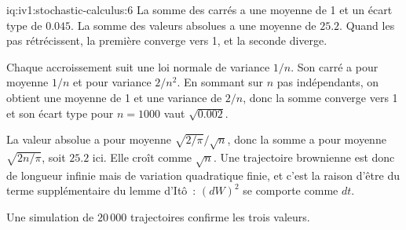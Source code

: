 \begin{solution}{iq:iv1:stochastic-calculus:6}
La somme des carrés a une moyenne de 1 et un écart type de $0.045$. La somme des valeurs absolues a une moyenne de $25.2$. Quand les pas rétrécissent, la première converge vers 1, et la seconde diverge.

Chaque accroissement suit une loi normale de variance $1/n$. Son carré a pour moyenne $1/n$ et pour variance $2/n^2$. En sommant sur $n$ pas indépendants, on obtient une moyenne de 1 et une variance de $2/n$, donc la somme converge vers 1 et son écart type pour $n = 1000$ vaut $\sqrt{0.002}$.

La valeur absolue a pour moyenne $\sqrt{2/\pi}/\sqrt{n}$, donc la somme a pour moyenne $\sqrt{2n/\pi}$, soit $25.2$ ici. Elle croît comme $\sqrt{n}$. Une trajectoire brownienne est donc de longueur infinie mais de variation quadratique finie, et c'est la raison d'être du terme supplémentaire du lemme d'Itô~: $(dW)^2$ se comporte comme $dt$.

Une simulation de $20\,000$ trajectoires confirme les trois valeurs.



\end{solution}

